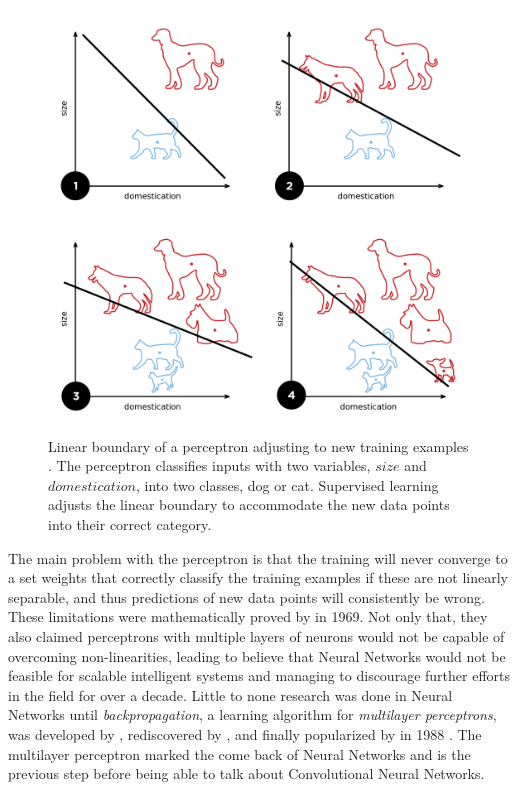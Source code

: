 \begin{figure}[htb]
  \includegraphics[width=\textwidth]{gfx/perceptron-training}
  \caption{Linear boundary of a perceptron adjusting to new training examples \cite{Goodspeed2015}.
    The perceptron classifies inputs with two variables, $size$ and $domestication$, into two classes, dog or cat.
    Supervised learning adjusts the linear boundary to accommodate the new data points into their correct category.}
  \label{fig:sec:theory:perceptron-training}
\end{figure}

The main problem with the perceptron is that the training will never converge to a set weights that correctly classify the training examples if these are not linearly separable, and thus predictions of new data points will consistently be wrong.
These limitations were mathematically proved by \citet{Minsky1969} in 1969.
Not only that, they also claimed perceptrons with multiple layers of neurons would not be capable of overcoming non-linearities, leading to believe that Neural Networks would not be feasible for scalable intelligent systems and managing to discourage further efforts in the field for over a decade.
Little to none research was done in Neural Networks until \emph{backpropagation}, a learning algorithm for \emph{multilayer perceptrons}, was developed by \citet{Werbos1974}, rediscovered by \citet{Parker1985}, and finally popularized by \citet{Rumelhart1988} in 1988 \cite{Ruck1990}.
The multilayer perceptron marked the come back of Neural Networks and is the previous step before being able to talk about Convolutional Neural Networks.


